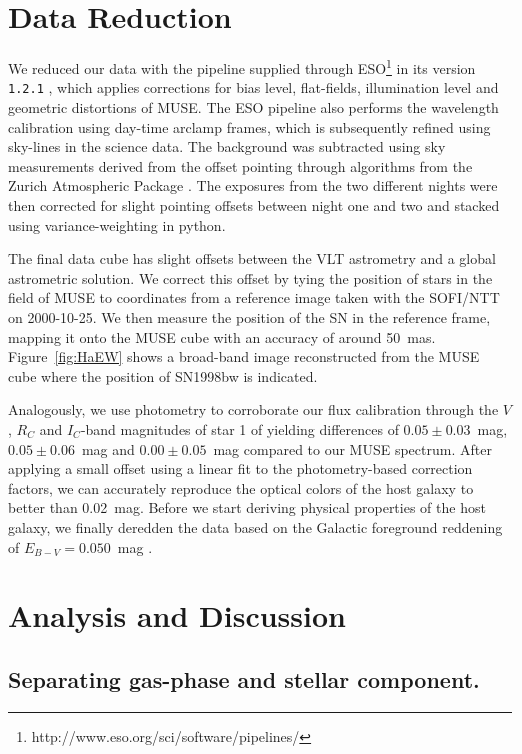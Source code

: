 \documentclass[traditabstract]{aa}
\begin{document}
\section{Data Reduction}

We reduced our data with the pipeline supplied through ESO\footnote{http://www.eso.org/sci/software/pipelines/} in its version \texttt{1.2.1} \citep{2014ASPC..485..451W}, which applies corrections for bias level, flat-fields, illumination level and geometric distortions of MUSE. The ESO pipeline also performs the wavelength calibration using day-time arclamp frames, which is subsequently refined using sky-lines in the science data. The background was subtracted using sky measurements derived from the offset pointing through algorithms from the Zurich Atmospheric Package \citep{2016MNRAS.458.3210S}. The exposures from the two different nights were then corrected for slight pointing offsets between night one and two and stacked using variance-weighting in python.

The final data cube has slight offsets between the VLT astrometry and a global astrometric solution. We correct this offset by tying the position of stars in the field of MUSE to coordinates from a reference image taken with the SOFI/NTT on 2000-10-25. We then measure the position of the SN in the reference frame, mapping it onto the MUSE cube with an accuracy of around 50~mas. Figure~\ref{fig:HaEW} shows a broad-band image reconstructed from the MUSE cube where the position of SN1998bw is indicated.

Analogously, we use photometry to corroborate our flux calibration through the $V$, $R_C$ and $I_C$-band magnitudes of star 1 of \citet{2011AJ....141..163C} yielding differences of $0.05\pm0.03$~mag, $0.05\pm0.06$~mag and $0.00\pm0.05$~mag compared to our MUSE spectrum. After applying a small offset using a linear fit to the photometry-based correction factors, we can accurately reproduce the optical colors of the host galaxy \citep{2005NewA...11..103S} to better than 0.02~mag. Before we start deriving physical properties of the host galaxy, we finally deredden the data based on the Galactic foreground reddening of $E_{B-V}=0.050$~mag \citep{2011ApJ...737..103S}. 


\section{Analysis and Discussion}

\subsection{Separating gas-phase and stellar component.}
\end{document}
